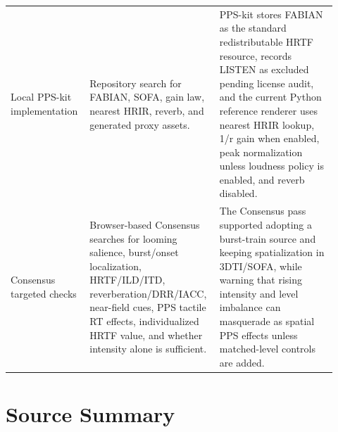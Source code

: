 \documentclass[10pt]{article}
\begin{document}
\begin{longtable}{P{0.23\linewidth} P{0.34\linewidth} P{0.35\linewidth}}
Local PPS-kit implementation & Repository search for FABIAN, SOFA, gain law, nearest HRIR, reverb, and generated proxy assets. & PPS-kit stores FABIAN as the standard redistributable HRTF resource, records LISTEN as excluded pending license audit, and the current Python reference renderer uses nearest HRIR lookup, 1/r gain when enabled, peak normalization unless loudness policy is enabled, and reverb disabled.\\
Consensus targeted checks & Browser-based Consensus searches for looming salience, burst/onset localization, HRTF/ILD/ITD, reverberation/DRR/IACC, near-field cues, PPS tactile RT effects, individualized HRTF value, and whether intensity alone is sufficient. & The Consensus pass supported adopting a burst-train source and keeping spatialization in 3DTI/SOFA, while warning that rising intensity and level imbalance can masquerade as spatial PPS effects unless matched-level controls are added.\\
\bottomrule
\end{longtable}

\section*{Source Summary}
\end{document}
